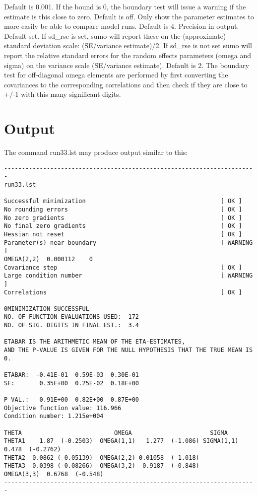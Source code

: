 \begin{optionlist}
\nextopt
{}
Default is 0.001. If the bound is 0, the boundary test will issue a warning if the estimate is this close to zero. 
\nextopt
{}
    Default is off. Only show the parameter estimates to more easily
    be able to compare model runs.
\nextopt
{}
Default is 4. Precision in output.  
\nextopt
{}
Default set. If sd\_rse is set, sumo will report these on the (approximate) standard deviation scale: (SE/variance estimate)/2. If sd\_rse is not set sumo will report the relative standard errors for the random effects parameters (omega and sigma) on the variance scale (SE/variance estimate).
\nextopt
{}
Default is 2. The boundary test for off-diagonal omega elements are performed by first converting the covariances to the corresponding correlations and then check if they are close to +/-1 with this many significant digits.  
\nextopt
\end{optionlist}

\section{Output}
The command run33.lst may produce output similar to this:
\begin{verbatim}
-----------------------------------------------------------------------
run33.lst

Successful minimization                                      [ OK ]   
No rounding errors                                           [ OK ]   
No zero gradients                                            [ OK ]   
No final zero gradients                                      [ OK ]   
Hessian not reset                                            [ OK ]   
Parameter(s) near boundary                                   [ WARNING ]   
OMEGA(2,2)	0.000112	0
Covariance step                                              [ OK ]   
Large condition number                                       [ WARNING ]   
Correlations                                                 [ OK ]

0MINIMIZATION SUCCESSFUL
NO. OF FUNCTION EVALUATIONS USED:  172
NO. OF SIG. DIGITS IN FINAL EST.:  3.4

ETABAR IS THE ARITHMETIC MEAN OF THE ETA-ESTIMATES,
AND THE P-VALUE IS GIVEN FOR THE NULL HYPOTHESIS THAT THE TRUE MEAN IS 0.

ETABAR:  -0.41E-01  0.59E-03  0.30E-01
SE:       0.35E+00  0.25E-02  0.18E+00

P VAL.:   0.91E+00  0.82E+00  0.87E+00
Objective function value: 116.966
Condition number: 1.215e+004

THETA                          OMEGA                      SIGMA            
THETA1    1.87  (-0.2503)  OMEGA(1,1)   1.277  (-1.086) SIGMA(1,1) 0.478  (-0.2762) 
THETA2  0.0862 (-0.05139)  OMEGA(2,2) 0.01058  (-1.018)                                
THETA3  0.0398 (-0.08266)  OMEGA(3,2)  0.9187  (-0.848)
OMEGA(3,3)  0.6768  (-0.548)
-----------------------------------------------------------------------
\end{verbatim}

